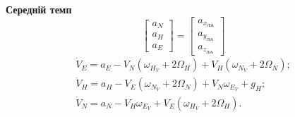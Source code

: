 \textbf{Середній темп}
\begin{equation} 
\label{eq:maccel} 
\left[\begin{array}{c} 
{a_{N}} \\ 
{a_{H}} \\ 
{a_{E}} \end{array}\right]=
\left[\begin{array}{c} 
{a_{x_{\text{ЛА}}}} \\ 
{a_{y_{\text{ЛА}}}} \\ 
{a_{z_{\text{ЛА}}}} 
\end{array}\right]                                                    
\end{equation} 
\begin{equation} 
\label{eq:mdv} 
\begin{array}{l} 
{\dot{V}_{E} =a_{E} -V_{N}(\omega_{H_{V}} +2\Omega_{H} )+V_{H} (\omega_{N_{V}} +2\Omega_{N} );} \\ 
{\dot{V}_{H} =a_{H} -V_{E}(\omega_{N_{V}} +2\Omega_{N} )+V_{N} \omega_{E_{V}} +g_{H} ;} \\ 
{\dot{V}_{N} =a_{N} -V_{H} \omega_{E_{V}} +V_{E} (\omega_{H_{V}} +2\Omega_{H} ).} 
\end{array} 
\end{equation} 

